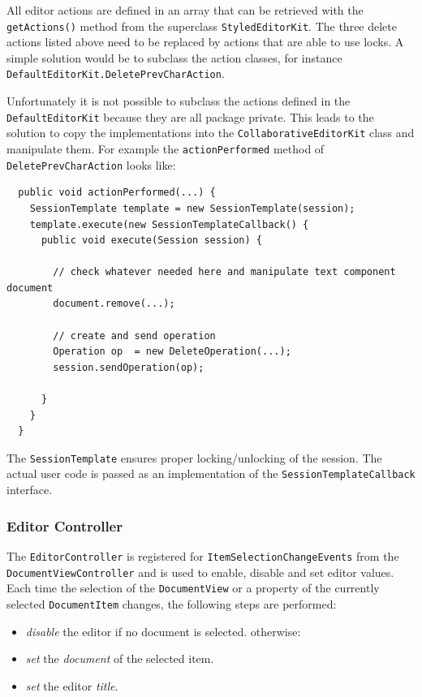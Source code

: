 All editor actions are defined in an array that can be retrieved with the \texttt{getActions()} method from the superclass \texttt{StyledEditorKit}. The three delete actions listed above need to be replaced by actions that are able to use locks. A simple solution would be to subclass the action classes,
for instance \texttt{Default\-Editor\-Kit.Delete\-Prev\-Char\-Action}.

Unfortunately it is not possible to subclass the actions defined in the \texttt{DefaultEditorKit} because they are all package private. This leads to the solution to copy the implementations into the \texttt{Collaborative\-Editor\-Kit} class and manipulate them. For example the \texttt{actionPerformed} method of \texttt{DeletePrevCharAction} looks like:

\begin{verbatim}
  public void actionPerformed(...) {
    SessionTemplate template = new SessionTemplate(session);
    template.execute(new SessionTemplateCallback() {
      public void execute(Session session) {

        // check whatever needed here and manipulate text component document
        document.remove(...);
        
        // create and send operation
        Operation op  = new DeleteOperation(...);
        session.sendOperation(op);

      }
    }
  }
\end{verbatim}

The \texttt{Session\-Template} ensures proper locking/unlocking of the session. The actual user code is passed as an implementation of the \texttt{Session\-Template\-Callback} interface.


\subsubsection{Editor Controller}
The \texttt{Editor\-Controller} is registered for \texttt{Item\-Selection\-Change\-Events} from the \texttt{Document\-View\-Controller} and is used to enable, disable and set editor values. Each time the selection of the \texttt{Document\-View} or a property of the currently selected \texttt{Document\-Item} changes, the following steps are performed:

\begin{itemize}
\item \emph{disable} the editor if no document is selected. otherwise:
\item \emph{set} the \emph{document} of the selected item.
\item \emph{set} the editor \emph{title}.
\end{itemize}


